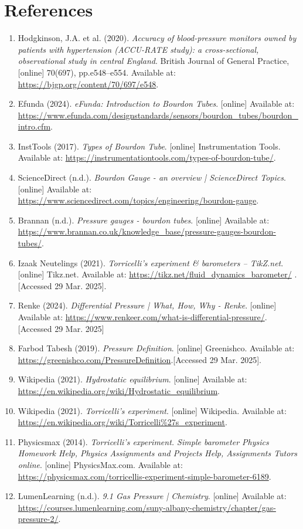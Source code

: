 \documentclass{article}
\begin{document}
	
	\newpage
	\section{References}	
	\begin{enumerate}
		\item Hodgkinson, J.A. et al. (2020). \textit{Accuracy of blood-pressure monitors owned by patients with hypertension (ACCU-RATE study): a cross-sectional, observational study in central England}. British Journal of General Practice, [online] 70(697), pp.e548–e554. Available at: \url{https://bjgp.org/content/70/697/e548}.
		\item Efunda (2024). \textit{eFunda: Introduction to Bourdon Tubes}. [online] Available at: \url{https://www.efunda.com/designstandards/sensors/bourdon_tubes/bourdon_intro.cfm}.
		\item InstTools (2017). \textit{Types of Bourdon Tube}. [online] Instrumentation Tools. Available at: \url{https://instrumentationtools.com/types-of-bourdon-tube/}.
		\item ScienceDirect (n.d.). \textit{Bourdon Gauge - an overview | ScienceDirect Topics}. [online] Available at: \url{https://www.sciencedirect.com/topics/engineering/bourdon-gauge}.
		‌\item Brannan (n.d.). \textit{Pressure gauges - bourdon tubes}. [online] Available at: \url{https://www.brannan.co.uk/knowledge_base/pressure-gauges-bourdon-tubes/}.
		\item Izaak Neutelings (2021). \textit{Torricelli’s experiment \& barometers – TikZ.net}. [online] Tikz.net. Available at: \url{https://tikz.net/fluid_dynamics_barometer/} .[Accessed 29 Mar. 2025].
		\item Renke (2024). \textit{Differential Pressure | What, How, Why - Renke}. [online] Available at: \url{https://www.renkeer.com/what-is-differential-pressure/}.[Accessed 29 Mar. 2025]
		\item Farbod Tabesh (2019). \textit{Pressure Definition}. [online] Greenishco. Available at: \url{https://greenishco.com/PressureDefinition}.[Accessed 29 Mar. 2025].	‌
		\item Wikipedia (2021). \textit{Hydrostatic equilibrium}. [online] Available at: \url{https://en.wikipedia.org/wiki/Hydrostatic_equilibrium}.
		\item Wikipedia (2021). \textit{Torricelli’s experiment}. [online] Wikipedia. Available at: \url{https://en.wikipedia.org/wiki/Torricelli%27s_experiment}.
		\item Physicsmax (2014). \textit{Torricelli’s experiment. Simple barometer Physics Homework Help, Physics Assignments and Projects Help, Assignments Tutors online}. [online] PhysicsMax.com. Available at: \url{https://physicsmax.com/torricellis-experiment-simple-barometer-6189}.
		‌\item LumenLearning (n.d.). \textit{9.1 Gas Pressure | Chemistry}. [online] Available at: \url{https://courses.lumenlearning.com/suny-albany-chemistry/chapter/gas-pressure-2/}.
		
		‌
		
		
	\end{enumerate}
	‌	
	\newpage
	
\end{document}
